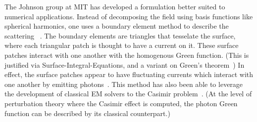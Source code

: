 The Johnson group at MIT has developed a formulation better suited to numerical applications.
Instead of decomposing the field using basis functions like spherical harmonics,
one uses a boundary element method to describe the scattering~
\cite{Rodriguez2007,Rodriguez2007a, Rodriguez2009,Reid2009,Reid2011, Reid2013}.  
The boundary elements are triangles that tesselate the surface, where each triangular patch is 
thought to have a current on it.  
These surface patches interact with one another with the homogenous Green function.  
(This is justified via Surface-Integral-Equations\cite{Stratton1941}, and a variant on Green's theorem~\cite{Emig2004})
In effect, the surface patches appear to have fluctuating currents which interact with one another by emitting 
photons~\cite{Reid2013}.  
This method has also been able to leverage the development of classical EM solvers to the Casimir problem~\cite{Johnson2011}.
(At the level of perturbation theory where the Casimir effect is computed, the photon Green function 
can be described by its classical counterpart.)




